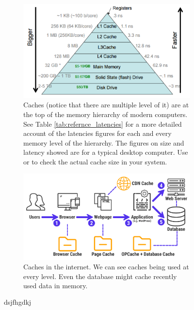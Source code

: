\begin{figure}
	\centering
	\begin{subfigure}[t]{0.49\textwidth}
		\includegraphics[width=1\linewidth]{sources/LRU_cache/images/cpu_caches}
		\caption{Caches (notice that there are multiple level of it) are at the top of the memory hierarchy of modern computers. See Table \ref{tab:refernce_latencies} for a more detailed account of the latencies figures for each and every memory level of the hierarchy. The figures on size and latency showed are for a typical desktop computer. Use  or  to check the actual cache size in your system.}
		\label{fig:LRU_cache:cpu_cache}
	 \end{subfigure}
	\hfill
	\begin{subfigure}[t]{0.49\textwidth}
		\includegraphics[width=1\linewidth]{sources/LRU_cache/images/web_caches}
		\caption{Caches in the internet. We can see caches being used at every level. Even the database might cache recently used data in memory.}
		\label{fig:LRU_cache:web_cache}
	 \end{subfigure}
	 \caption[]{dsjfhgdkj}
	  \label{fig:LRU_cache:caches_example}
\end{figure}


